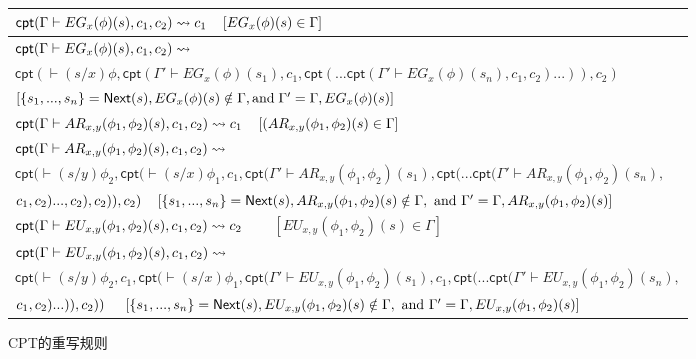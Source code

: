 \begin{figure}[t]
\begin{tabular}{|ll|}
		\multicolumn{2}{|l|}{$\textsf{cpt}(\Gamma\vdash EG_x(\phi)(s), c_1, c_2)\rightsquigarrow c_1 ~~~ \left[EG_x(\phi)(s)\in \Gamma\right]~~~~~~$}\\ \hline
		\multicolumn{2}{|l|}{$\textsf{cpt}(\Gamma\vdash EG_x(\phi)(s), c_1, c_2)\rightsquigarrow$}\\
		\multicolumn{2}{|l|}{$\textsf{cpt}(\vdash(s/x)\phi, \textsf{cpt}(\Gamma'\vdash EG_x(\phi)(s_1), c_1, \textsf{cpt}(...\textsf{cpt}(\Gamma'\vdash EG_x(\phi)(s_n), c_1, c_2)...)), c_2)$}\\
		\multicolumn{2}{|l|}{$\left[\{s_1,...,s_n\}=\textsf{Next}(s), EG_x(\phi)(s)\notin \Gamma, \textup{and}\; \Gamma'=\Gamma, EG_x(\phi)(s)\right]$}\\ \hline
		
		\multicolumn{2}{|l|}{$\textsf{cpt}(\Gamma\vdash AR_{x,y}(\phi_1,\phi_2)(s), c_1, c_2)\rightsquigarrow c_1 ~~~ \left[(AR_{x,y}(\phi_1,\phi_2)(s)\in \Gamma\right]~~~~~~$}\\\hline
		\multicolumn{2}{|l|}{$\textsf{cpt}(\Gamma\vdash AR_{x,y}(\phi_1,\phi_2)(s), c_1, c_2)\rightsquigarrow$}\\
		\multicolumn{2}{|l|}{$\textsf{cpt}(\vdash(s/y)\phi_2, \textsf{cpt}(\vdash (s/x)\phi_1, c_1, \textsf{cpt}(\Gamma'\vdash AR_{x,y}(\phi_1,\phi_2)(s_1), \textsf{cpt}(...\textsf{cpt}(\Gamma'\vdash AR_{x,y}(\phi_1,\phi_2)(s_n),$}\\
		\multicolumn{2}{|l|}{$  c_1, c_2)..., c_2), c_2)), c_2)~~~
			\left[\{s_1,...,s_n\}=\textsf{Next}(s), AR_{x,y}(\phi_1,\phi_2)(s)\notin \Gamma, \textup{ and } \Gamma'=\Gamma,AR_{x,y}(\phi_1,\phi_2)(s)\right]$}\\ \hline
		
		\multicolumn{2}{|l|}{$\textsf{cpt}(\Gamma\vdash EU_{x,y}(\phi_1,\phi_2)(s), c_1, c_2)\rightsquigarrow c_2$ ~~~ $\left[EU_{x,y}(\phi_1,\phi_2)(s)\in \Gamma\right]~~~~~~$}\\\hline
		\multicolumn{2}{|l|}{$\textsf{cpt}(\Gamma\vdash EU_{x,y}(\phi_1,\phi_2)(s), c_1, c_2)\rightsquigarrow$}\\
		\multicolumn{2}{|l|}{$ \textsf{cpt}(\vdash(s/y)\phi_2, c_1, \textsf{cpt}(\vdash(s/x)\phi_1,\textsf{cpt}(\Gamma'\vdash EU_{x,y}(\phi_1,\phi_2)(s_1), c_1, \textsf{cpt}(...\textsf{cpt}(\Gamma'\vdash EU_{x,y}(\phi_1,\phi_2)(s_n),$}\\
		\multicolumn{2}{|l|}{$ c_1, c_2)...)), c_2))~~~~\left[\{s_1,...,s_n\}=\textsf{Next}(s), EU_{x,y}(\phi_1,\phi_2)(s)\notin \Gamma, \textup{ and } \Gamma'=\Gamma, EU_{x,y}(\phi_1,\phi_2)(s)\right]$} \\ \hline
	\end{tabular}
	\caption{\textsf{CPT}的重写规则}\label{fig:rewriting}
\end{figure}

